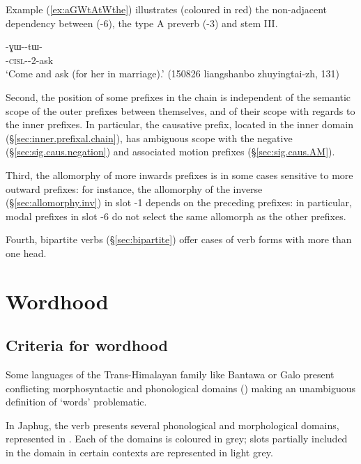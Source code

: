  Example (\ref{ex:aGWtAtWthe}) illustrates (coloured in red) the non-adjacent dependency between  (-6), the type A preverb (-3) and stem III.
 
 \begin{exe}
\ex \label{ex:aGWtAtWthe}
\gll {}-ɣɯ--tɯ- \\
 -\textsc{cisl}--2-ask\rouge{[III]} \\
\glt `Come and ask (for her in marriage).' (150826 liangshanbo zhuyingtai-zh, 131)
\end{exe}
 
  
Second, the position of some prefixes in the chain is independent of the semantic scope of the outer prefixes between themselves, and of their scope with regards to the inner prefixes.  In particular, the causative prefix, located in the inner domain (§\ref{sec:inner.prefixal.chain}), has ambiguous scope with the negative (§\ref{sec:sig.caus.negation}) and associated motion prefixes (§\ref{sec:sig.caus.AM}).  

Third, the allomorphy of more inwards prefixes is in some cases sensitive to more outward prefixes: for instance, the allomorphy of the inverse (§\ref{sec:allomorphy.inv}) in slot -1 depends on the preceding prefixes: in particular, modal prefixes in slot -6 do not select the same allomorph as the other prefixes. 

Fourth, bipartite verbs (§\ref{sec:bipartite}) offer cases of verb forms with more than one head.


 \section{Wordhood} \label{sec:wordhood.verb}

\subsection{Criteria for wordhood} \label{sec:wordhood.criteria.verb}
Some languages of the Trans-Himalayan family  like Bantawa or Galo present conflicting morphosyntactic and phonological domains (\citealt{post09disunity, schiering10prosodic, doornenbal09}) making an unambiguous definition of `words' problematic.
 
In Japhug, the verb presents several phonological and morphological domains, represented in . Each of the domains is coloured in grey; slots partially included in the domain in certain contexts are represented in light grey.
 
